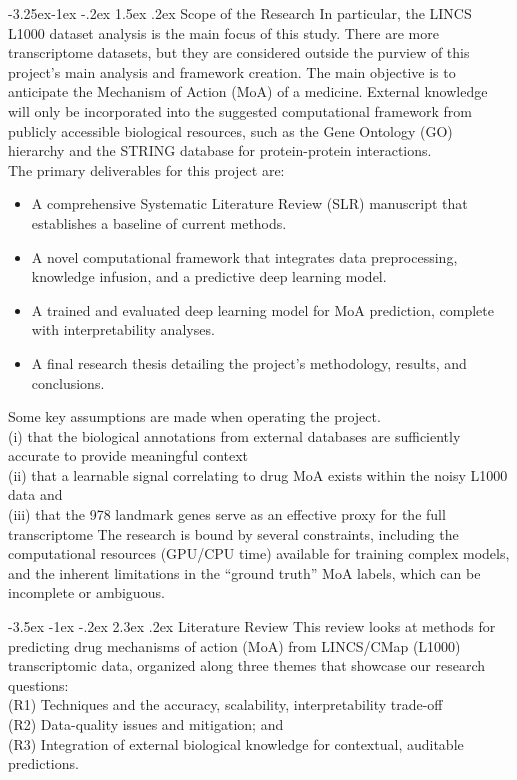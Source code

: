\documentclass[12pt,a4paper]{article}
\makeatletter
\renewcommand\section{\@startsection{section}{1}{\z@}%
  {-3.5ex \@plus-1ex \@minus-.2ex}%
  {2.3ex \@plus.2ex}%
  {\normalfont\large\bfseries}}
\renewcommand\subsection{\@startsection{subsection}{2}{\z@}%
  {-3.25ex\@plus-1ex \@minus-.2ex}%
  {1.5ex \@plus.2ex}%
  {\normalfont\normalsize\bfseries}}
\makeatother
\begin{document}
\subsection{Scope of the Research}
In particular, the LINCS L1000 dataset analysis is the main focus of this study.  There are more transcriptome datasets, but they are considered outside the purview of this project's main analysis and framework creation. The main objective is to anticipate the Mechanism of Action (MoA) of a medicine.  External knowledge will only be incorporated into the suggested computational framework from publicly accessible biological resources, such as the Gene Ontology (GO) hierarchy and the STRING database for protein-protein interactions.
\\
The primary deliverables for this project are:
\begin{itemize}
  \item A comprehensive Systematic Literature Review (SLR) manuscript that establishes a baseline of current methods.
  \item A novel computational framework that integrates data preprocessing, knowledge infusion, and a predictive deep learning model.
  \item A trained and evaluated deep learning model for MoA prediction, complete with interpretability analyses.
  \item A final research thesis detailing the project's methodology, results, and conclusions.
\end{itemize}
Some key assumptions are made when operating the project.\\
(i) that the biological annotations from external databases are sufficiently accurate to provide meaningful context\\ (ii) that a learnable signal correlating to drug MoA exists within the noisy L1000 data and\\(iii) that the 978 landmark genes serve as an effective proxy for the full transcriptome
The research is bound by several constraints, including the computational resources (GPU/CPU time) available for training complex models, and the inherent limitations in the \enquote{ground truth} MoA labels, which can be incomplete or ambiguous.


\section{Literature Review}
This review looks at methods for predicting drug mechanisms of action (MoA) from LINCS/CMap (L1000) transcriptomic data, organized along three themes that showcase our research questions: \\(R1) Techniques and the accuracy, scalability, interpretability trade-off \\ (R2) Data-quality issues and mitigation; and \\(R3) Integration of external biological knowledge for contextual, auditable predictions.
\end{document}

